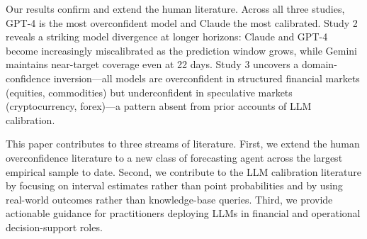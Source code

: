 Our results confirm and extend the human literature. Across all three studies,
GPT-4 is the most overconfident model and Claude the most calibrated. Study 2
reveals a striking model divergence at longer horizons: Claude and GPT-4 become
increasingly miscalibrated as the prediction window grows, while Gemini maintains
near-target coverage even at 22 days. Study 3 uncovers a domain-confidence
inversion---all models are overconfident in structured financial markets
(equities, commodities) but underconfident in speculative markets (cryptocurrency,
forex)---a pattern absent from prior accounts of LLM calibration.

This paper contributes to three streams of literature. First, we extend the human
overconfidence literature \citep{Soll2004, Griffin1992} to a new class of forecasting
agent across the largest empirical sample to date. Second, we contribute to the LLM
calibration literature \citep{Kadavath2022, Xiong2024} by focusing on interval
estimates rather than point probabilities and by using real-world outcomes rather than
knowledge-base queries. Third, we provide actionable guidance for practitioners
deploying LLMs in financial and operational decision-support roles.

